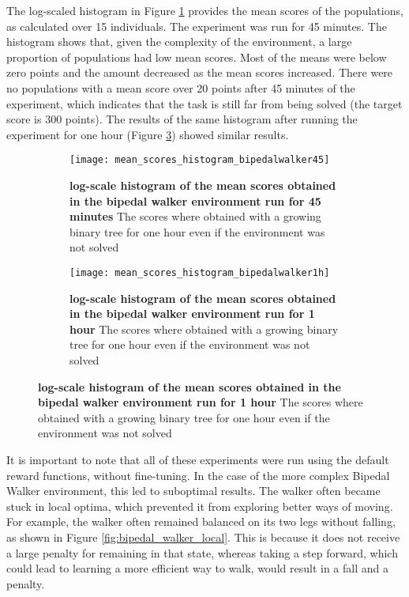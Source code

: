 The log-scaled histogram in Figure \ref{fig:bipedal_histogram1} provides the mean scores of the populations, as calculated over 15 individuals. The experiment was run for 45 minutes. The histogram shows that, given the complexity of the environment, a large proportion of populations had low mean scores. Most of the means were below zero points and the amount decreased as the mean scores increased. There were no populations with a mean score over 20 points after 45 minutes of the experiment, which indicates that the task is still far from being solved (the target score is 300 points). The results of the same histogram after running the experiment for one hour (Figure \ref{fig:bipedal_histogram2}) showed similar results.

\begin{figure}[!ht]
    \centering
    \begin{subfigure}{0.48\textwidth}
		\texttt{[image: mean\_scores\_histogram\_bipedalwalker45]}
		\caption[log-scale histogram of the mean scores obtained in the bipedal walker environment run for 45 minutes]{
			\textbf{log-scale histogram of the mean scores obtained in the bipedal walker environment run for 45 minutes} The scores where obtained with a growing binary tree for one hour even if the environment was not solved
			}
		\label{fig:bipedal_histogram1}
    \end{subfigure}%
    \hspace{1em}
    \begin{subfigure}{0.48\textwidth}
        \texttt{[image: mean\_scores\_histogram\_bipedalwalker1h]}
		\caption[log-scale histogram of the mean scores obtained in the bipedal walker environment run for 1 hour]{
  			\textbf{log-scale histogram of the mean scores obtained in the bipedal walker environment run for 1 hour} The scores where obtained with a growing binary tree for one hour even if the environment was not solved
  			}
		\label{fig:bipedal_histogram2}
    \end{subfigure}
\end{figure}

It is important to note that all of these experiments were run using the default reward functions, without fine-tuning. In the case of the more complex Bipedal Walker environment, this led to suboptimal results. The walker often became stuck in local optima, which prevented it from exploring better ways of moving. For example, the walker often remained balanced on its two legs without falling, as shown in Figure \ref{fig:bipedal_walker_local}. This is because it does not receive a large penalty for remaining in that state, whereas taking a step forward, which could lead to learning a more efficient way to walk, would result in a fall and a penalty.

